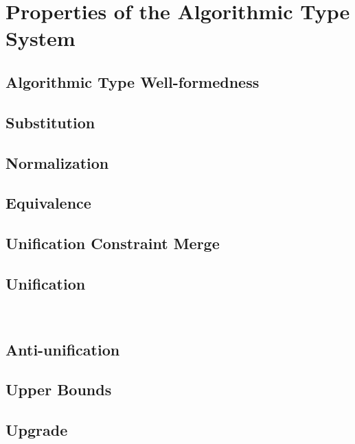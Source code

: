 \documentclass[acmsmall,natbib=false,review,anonymous]{acmart}
\newcommand{\genDir}{_gen}
\begin{document}
\section{Properties of the Algorithmic Type System}

\subsection{Algorithmic Type Well-formedness}


\subsection{Substitution}


\subsection{Normalization}


\subsection{Equivalence}


\subsection{Unification Constraint Merge}


\subsection{Unification}
\

\subsection{Anti-unification}


\subsection{Upper Bounds}
\label{sec:alg-upper-bounds-proofs}


\subsection{Upgrade}
\label{sec:upgrade-lemmas}

\end{document}
